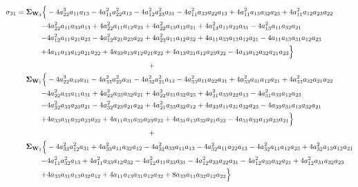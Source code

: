 \documentclass{article}
\begin{document}
\begin{equation}
\begin{aligned}
\sigma_{31} =  \mathbf{\Sigma}_{\textbf{W}_{3}} \Bigl\{ & -4 a_{22}^{3} a_{11} a_{13} - 4 a_{11}^{2} a_{22}^{2} a_{13} - 4 a_{12}^{2} a_{23}^{2} a_{31} - 4 a_{11}^{2} a_{33} a_{22} a_{13} + 4 a_{11}^{2} a_{13} a_{32} a_{23} + 4 a_{11}^{2} a_{12} a_{23} a_{22} \\
-&4 a_{22}^{2} a_{11} a_{33} a_{13} + 4 a_{22}^{2} a_{11} a_{12} a_{23} + 4 a_{22}^{2} a_{13} a_{12} a_{21} + 4 a_{13}^{2} a_{11} a_{22} a_{31} - 4a_{13}^{2} a_{11} a_{32} a_{21} \\
-&4 a_{12}^{2} a_{11} a_{21} a_{23} - 4 a_{12}^{2} a_{21} a_{23} a_{22} + 4 a_{23}^{2} a_{11} a_{12} a_{32} + 4 a_{11} a_{33} a_{13} a_{12} a_{21} - 4 a_{11} a_{13}a_{31} a_{12} a_{23} \\
+&4 a_{11} a_{13} a_{12} a_{21} a_{22} + 4 a_{33} a_{13} a_{12} a_{21} a_{22} + 4 a_{13} a_{31} a_{12} a_{23} a_{22} - 4 a_{13} a_{12} a_{32} a_{21} a_{23}\Bigr\} \\
& \qquad \qquad \qquad \qquad \qquad \qquad \qquad + \\
\mathbf{\Sigma}_{\textbf{W}_{1}} \Bigl\{& -4 a_{22}^{3} a_{33} a_{31} - 4 a_{33}^{2} a_{22}^{2} a_{31} - 4 a_{32}^{2} a_{21}^{2} a_{13} - 4 a_{33}^{2} a_{11} a_{22} a_{31} + 4 a_{33}^{2} a_{31} a_{12} a_{21} + 4 a_{33}^{2} a_{32} a_{21} a_{22} \\
-&4 a_{22}^{2} a_{33} a_{11} a_{31} + 4 a_{22}^{2} a_{33} a_{32} a_{21} + 4 a_{22}^{2} a_{31} a_{32} a_{23} + 4 a_{31}^{2} a_{33} a_{22} a_{13} - 4 a_{31}^{2} a_{33} a_{12} a_{23} \\
-&4 a_{32}^{2} a_{33} a_{23} a_{21} - 4 a_{32}^{2} a_{23} a_{21} a_{22} + 4 a_{21}^{2} a_{33} a_{32} a_{12} + 4 a_{33} a_{11} a_{31} a_{32} a_{23} - 4 a_{33} a_{31} a_{13} a_{32} a_{21} \\
+&4 a_{33} a_{31} a_{32} a_{23} a_{22} + 4 a_{11} a_{31} a_{32} a_{23} a_{22} + 4 a_{31} a_{13} a_{32} a_{21} a_{22} - 4 a_{31} a_{32} a_{12} a_{23} a_{21}\Bigr\} \\
& \qquad \qquad \qquad \qquad \qquad \qquad \qquad + \\
\mathbf{\Sigma}_{\textbf{W}_{2}} \Bigl\{& -4a_{33}^{2} a_{12}^{2} a_{31} + 4 a_{33}^{2} a_{11} a_{32} a_{12} - 4 a_{32}^{2} a_{33} a_{11} a_{13} - 4 a_{32}^{2} a_{11} a_{22} a_{13} - 4 a_{32}^{2} a_{11} a_{12} a_{23} + 4 a_{32}^{2} a_{13} a_{12} a_{21} \\
-&4 a_{11}^{2} a_{32}^{2} a_{13} + 4 a_{11}^{2} a_{33} a_{12} a_{32} - 4 a_{12}^{2} a_{11} a_{33} a_{31} - 4 a_{12}^{2} a_{33} a_{22} a_{31} - 4 a_{12}^{2} a_{33} a_{32} a_{21} + 4 a_{12}^{2} a_{31} a_{32} a_{23} \\
+&4 a_{33} a_{31} a_{13} a_{32} a_{12} + 4 a_{11} a_{13} a_{31} a_{12} a_{32} + 8 a_{33} a_{11} a_{32} a_{12} a_{22}\Bigr\}
\end{aligned}
\label{eq:network3by3_sigma31}
\end{equation}
\end{document}
